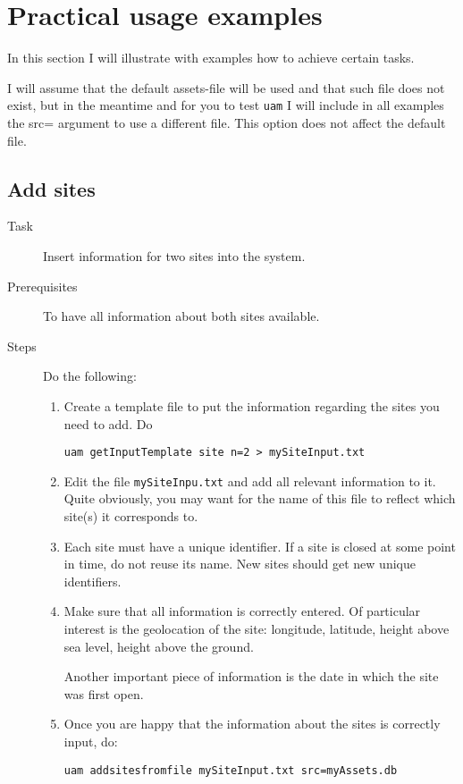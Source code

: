 \documentclass[12pt]{amsart}
\begin{document}
\section{Practical usage examples}

In this section I will illustrate with examples how to achieve certain tasks.

I will assume that the default assets-file will be used and that such file
does not exist, but in the meantime and for you to test {\tt uam} I will
include in all examples the src= argument to use a different file.
This option does not affect the default file. 

\subsection{Add sites}
\begin{description}
\item[Task] Insert information for two sites into the system.

\item[Prerequisites] To have all information about both sites available.

\item[Steps] Do the following:

\begin{enumerate}
\item Create a template file to put the information regarding the sites you need to add. Do

\begin{verbatim}
uam getInputTemplate site n=2 > mySiteInput.txt
\end{verbatim}

\item Edit the file  {\tt mySiteInpu.txt} and add all relevant information to it. Quite obviously, you may want for the name of this file to reflect which site(s) it corresponds to.

\item Each site must have a unique identifier. If a site is closed at some point in time, do not reuse its name. New sites should get new unique identifiers.

\item Make sure that all information is correctly entered. Of particular interest is the geolocation of the site: longitude, latitude, height above sea level, height above the ground.

Another important piece of information is the date in which the site was first open.

\item Once you are happy that the information about the sites is correctly input, do:

\begin{verbatim}
uam addsitesfromfile mySiteInput.txt src=myAssets.db
\end{verbatim}


\end{enumerate}
\end{description}
\end{document}
